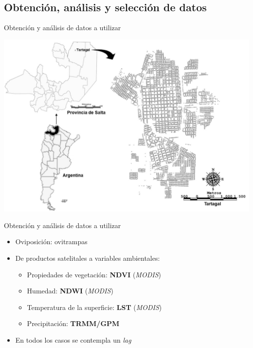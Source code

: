 \documentclass[10pt]{beamer}
\begin{document}
\subsection{Obtención, análisis y selección de datos}


\begin{frame}{Obtención y análisis de datos a utilizar}
  \begin{center}
    \includegraphics[width=.8\textwidth]{tartagal}
  \end{center}
\end{frame}


\begin{frame}{Obtención y análisis de datos a utilizar}
\begin{itemize}[<+->]
  \item Oviposición: ovitrampas
  \item De productos satelitales a variables ambientales:
      \begin{itemize}
        \item Propiedades de vegetación: \textbf{NDVI} (\textit{MODIS})
        \item Humedad: \textbf{NDWI} (\textit{MODIS})
        \item Temperatura de la superficie: \textbf{LST} (\textit{MODIS})
        \item Precipitación: \textbf{TRMM/GPM}
      \end{itemize}
  \item En todos los casos se contempla un \textit{lag}
\end{itemize}
\end{frame}
\end{document}
